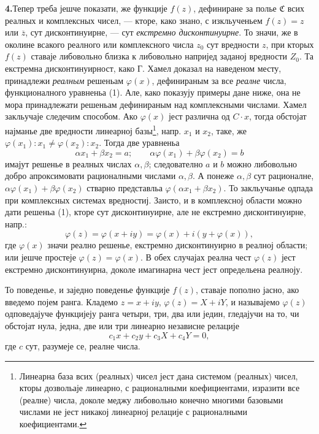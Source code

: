﻿\documentclass[11pt]{article}
\providecommand{\Cfield}{\mathfrak C}
\begin{document}

\medskip
\noindent\textbf{4.}\quad Тепер треба јешче показати, же функције \(f(z)\), дефиниране за полье \(\Cfield\) всих реалных и комплексных чисел, --- кторе, како знано, с изкльученьем \(f(z)=z\) или \(\overline z\), сут дисконтинуирне, --- сут {\itshape екстремно дисконтинуирне}. То значи, же в околине всакого реалного или комплексного числа \(z_0\) сут вредности \(z\), при кторых \(f(z)\) ставаје либовольно близка к либовольно напријед заданој вредности \(Z_0\). Та екстремна дисконтинуирност, како Г. Хамел доказал на наведеном месту, принадлежи {\itshape реалным} решеньам \(\varphi(x)\), дефинираным за все {\itshape реалне} числа, функционалного уравненьа (1). Але, како показују примеры дане ниже, она не мора принадлежати решеньам дефинираным над комплексными числами. Хамел закльучаје следечим способом. Ако \(\varphi(x)\) јест различна од \(C\cdot x\), тогда обстојат најманье две вредности линеарној базы\footnote{Линеарна база всих (реалных) чисел јест дана системом (реалных) чисел, кторы дозвольаје линеарно, с рационалными коефициентами, изразити все (реалне) числа, доколе меджу либовольно конечно многими базовыми числами не јест никакој линеарној релације с рационалными коефициентами.}, напр. \(x_1\) и \(x_2\), таке, же \(\varphi(x_1):x_1\ne\varphi(x_2):x_2\). Тогда две уравненьа
\[
\alpha x_1+\beta x_2=a;\qquad \alpha\varphi(x_1)+\beta\varphi(x_2)=b
\]
имајут решенье в реалных числах \(\alpha,\beta\); следователно \(a\) и \(b\) можно либовольно добро апроксимовати рационалными числами \(\alpha,\beta\). А понеже \(\alpha,\beta\) сут рационалне, \(\alpha\varphi(x_1)+\beta\varphi(x_2)\) стварно представльа \(\varphi(\alpha x_1+\beta x_2)\). То закльучанье одпада при комплексных системах вредностиј. Заисто, и в комплексној области можно дати решеньа (1), кторе сут дисконтинуирне, але не екстремно дисконтинуирне, напр.:
\[
\varphi(z)=\varphi(x+iy)=\varphi(x)+i(y+\varphi(x)),
\]
где \(\varphi(x)\) значи реално решенье, екстремно дисконтинуирно в реалној области; или јешче простеје \(\varphi(z)=\varphi(x)\). В обех случајах реална чест \(\varphi(z)\) јест екстремно дисконтинуирна, доколе имагинарна чест јест определьена реалноју.

То поведенье, и заједно поведенье функције \(f(z)\), ставаје пополно јасно, ако введемо појем ранга. Кладемо \(z=x+iy\), \(\varphi(z)=X+iY\), и называјемо \(\varphi(z)\) одповедајуче функцијеју ранга четыри, три, два или једин, гледајучи на то, чи обстојат нула, једна, две или три линеарно независне релације
\[
c_1x+c_2y+c_3X+c_4Y=0,
\]
где \(c\) сут, разумеје се, реалне числа.
\end{document}
